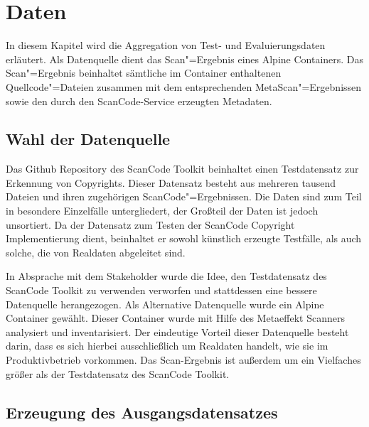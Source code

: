 \chapter{Daten}

In diesem Kapitel wird die Aggregation von Test- und Evaluierungsdaten erläutert.
Als Datenquelle dient das Scan"=Ergebnis eines Alpine Containers.
Das Scan"=Ergebnis beinhaltet sämtliche im Container enthaltenen Quellcode"=Dateien zusammen mit dem entsprechenden MetaScan"=Ergebnissen sowie den durch den ScanCode-Service erzeugten Metadaten.


\section{Wahl der Datenquelle}

Das Github Repository des ScanCode Toolkit beinhaltet einen Testdatensatz zur Erkennung von Copyrights.
Dieser Datensatz besteht aus mehreren tausend Dateien und ihren zugehörigen ScanCode"=Ergebnissen.
Die Daten sind zum Teil in besondere Einzelfälle untergliedert, der Großteil der Daten ist jedoch unsortiert.
Da der Datensatz zum Testen der ScanCode Copyright Implementierung dient, beinhaltet er sowohl künstlich erzeugte Testfälle, als auch solche, die von Realdaten abgeleitet sind.

In Absprache mit dem Stakeholder wurde die Idee, den Testdatensatz des ScanCode Toolkit zu verwenden verworfen und stattdessen eine bessere Datenquelle herangezogen.
Als Alternative Datenquelle wurde ein Alpine Container gewählt.
Dieser Container wurde mit Hilfe des Metaeffekt Scanners analysiert und inventarisiert.
Der eindeutige Vorteil dieser Datenquelle besteht darin, dass es sich hierbei ausschließlich um Realdaten handelt, wie sie im Produktivbetrieb vorkommen.
Das Scan-Ergebnis ist außerdem um ein Vielfaches größer als der Testdatensatz des ScanCode Toolkit.

\section{Erzeugung des Ausgangsdatensatzes}

